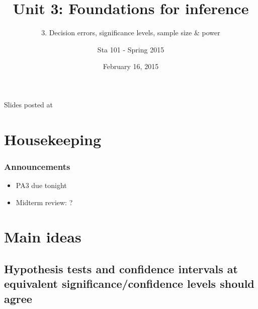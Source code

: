 \documentclass[11pt,containsverbatim,handout,xcolor=xelatex,dvipsnames,table]{beamer}
\title{Unit 3: Foundations for inference}
\subtitle{3. Decision errors, significance levels, sample size \& power}
\author{Sta 101 - Spring 2015}
\date{February 16, 2015}
\institute{Duke University, Department of Statistical Science}
\begin{document}


\begin{frame}[plain]

\titlepage
\vfill
{\scriptsize {} \hfill Slides posted at  \webLink{\CourseSite}{\CourseSite}}
\addtocounter{framenumber}{-1} 

\end{frame}


\section{Housekeeping}


\begin{frame}
\frametitle{Announcements}

\begin{itemize}

\item PA3 due tonight

\item Midterm review: ?

\end{itemize}

\end{frame}


\section{Main ideas}


\subsection{Hypothesis tests and confidence intervals at equivalent significance/confidence levels should agree}
\label{mi1}

\end{document}
